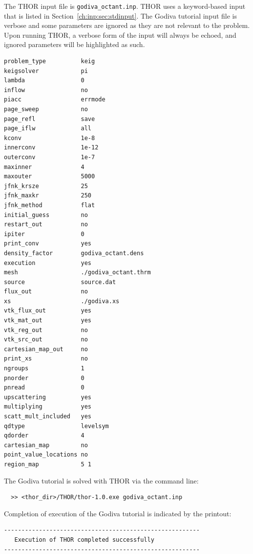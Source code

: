 The \ac{THOR} input file is \verb"godiva_octant.inp".
\ac{THOR} uses a keyword-based input that is listed in Section~\ref{ch:inp:sec:stdinput}.
The Godiva tutorial input file is verbose and some parameters are ignored as they are not relevant to the problem.
Upon running \ac{THOR}, a verbose form of the input will always be echoed, and ignored parameters will be highlighted as such.
\begin{verbatim}
problem_type          keig
keigsolver            pi
lambda                0
inflow                no
piacc                 errmode
page_sweep            no
page_refl             save
page_iflw             all
kconv                 1e-8
innerconv             1e-12
outerconv             1e-7
maxinner              4
maxouter              5000
jfnk_krsze            25
jfnk_maxkr            250
jfnk_method           flat
initial_guess         no
restart_out           no
ipiter                0
print_conv            yes
density_factor        godiva_octant.dens
execution             yes
mesh                  ./godiva_octant.thrm
source                source.dat
flux_out              no
xs                    ./godiva.xs
vtk_flux_out          yes
vtk_mat_out           yes
vtk_reg_out           no
vtk_src_out           no
cartesian_map_out     no
print_xs              no
ngroups               1
pnorder               0
pnread                0
upscattering          yes
multiplying           yes
scatt_mult_included   yes
qdtype                levelsym
qdorder               4
cartesian_map         no
point_value_locations no
region_map            5 1
\end{verbatim}

The Godiva tutorial is solved with \ac{THOR} via the command line:
\begin{verbatim}
  >> <thor_dir>/THOR/thor-1.0.exe godiva_octant.inp
\end{verbatim}

Completion of execution of the Godiva tutorial is indicated by the printout:
\begin{verbatim}
--------------------------------------------------------
   Execution of THOR completed successfully
--------------------------------------------------------
\end{verbatim}

